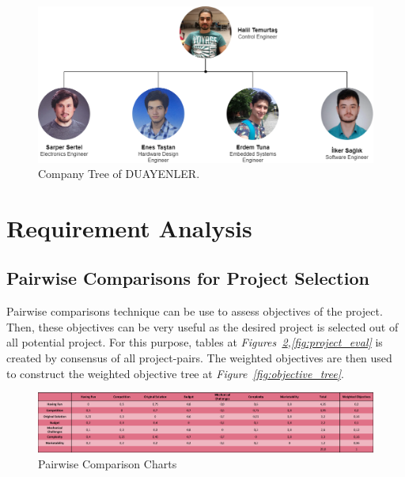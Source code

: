 \documentclass[a4paper,12pt]{article}
\begin{document}
\begin{figure}[t!]
	\centering
	\includegraphics[width=\textwidth,height=\textheight,keepaspectratio]{../../Documents/company/company-tree} 
	\caption{\label{fig:company_tree}Company Tree of DUAYENLER.}
\end{figure}

\newpage

\section{Requirement Analysis}
	
	\subsection{Pairwise Comparisons for Project Selection}
		Pairwise comparisons technique can be use to assess objectives of the project. Then, these objectives can be very useful as the desired project is selected out of all potential project. For this purpose, tables at \textit{Figures~\ref{fig:pairwise_comp},\ref{fig:project_eval}} is created by consensus of all project-pairs. The weighted objectives are then used to construct the weighted objective tree at \textit{Figure~\ref{fig:objective_tree}}. 

	\begin{figure}[H]
		\centering
		\includegraphics[width=\textwidth,height=\textheight,keepaspectratio]{images/objective_tree} 
		\caption{\label{fig:pairwise_comp}Pairwise Comparison Charts}
	\end{figure}	
	
\end{document}
